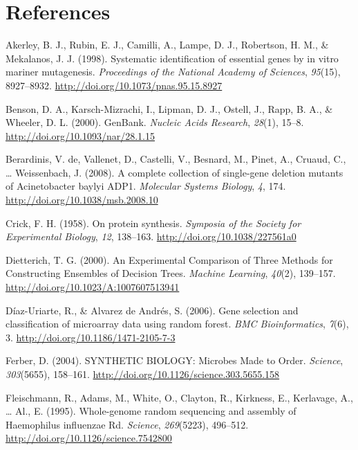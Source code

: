 \documentclass[]{report}
\begin{document}
\chapter*{References}\label{references}

\hypertarget{refs}{}
\hypertarget{ref-Akerley1998}{}
Akerley, B. J., Rubin, E. J., Camilli, A., Lampe, D. J., Robertson, H.
M., \& Mekalanos, J. J. (1998). Systematic identification of essential
genes by in vitro mariner mutagenesis. \emph{Proceedings of the National
Academy of Sciences}, \emph{95}(15), 8927--8932.
\url{http://doi.org/10.1073/pnas.95.15.8927}

\hypertarget{ref-Benson2000a}{}
Benson, D. A., Karsch-Mizrachi, I., Lipman, D. J., Ostell, J., Rapp, B.
A., \& Wheeler, D. L. (2000). GenBank. \emph{Nucleic Acids Research},
\emph{28}(1), 15--8. \url{http://doi.org/10.1093/nar/28.1.15}

\hypertarget{ref-DeBerardinis2008}{}
Berardinis, V. de, Vallenet, D., Castelli, V., Besnard, M., Pinet, A.,
Cruaud, C., \ldots{} Weissenbach, J. (2008). A complete collection of
single-gene deletion mutants of Acinetobacter baylyi ADP1.
\emph{Molecular Systems Biology}, \emph{4}, 174.
\url{http://doi.org/10.1038/msb.2008.10}

\hypertarget{ref-Crick1958}{}
Crick, F. H. (1958). On protein synthesis. \emph{Symposia of the Society
for Experimental Biology}, \emph{12}, 138--163.
\url{http://doi.org/10.1038/227561a0}

\hypertarget{ref-Dietterich2000}{}
Dietterich, T. G. (2000). An Experimental Comparison of Three Methods
for Constructing Ensembles of Decision Trees. \emph{Machine Learning},
\emph{40}(2), 139--157. \url{http://doi.org/10.1023/A:1007607513941}

\hypertarget{ref-DiazUriarte2006}{}
Díaz-Uriarte, R., \& Alvarez de Andrés, S. (2006). Gene selection and
classification of microarray data using random forest. \emph{BMC
Bioinformatics}, \emph{7}(6), 3.
\url{http://doi.org/10.1186/1471-2105-7-3}

\hypertarget{ref-Ferber2004}{}
Ferber, D. (2004). SYNTHETIC BIOLOGY: Microbes Made to Order.
\emph{Science}, \emph{303}(5655), 158--161.
\url{http://doi.org/10.1126/science.303.5655.158}

\hypertarget{ref-Fleischmann1995}{}
Fleischmann, R., Adams, M., White, O., Clayton, R., Kirkness, E.,
Kerlavage, A., \ldots{} Al., E. (1995). Whole-genome random sequencing
and assembly of Haemophilus influenzae Rd. \emph{Science},
\emph{269}(5223), 496--512. \url{http://doi.org/10.1126/science.7542800}
\end{document}
